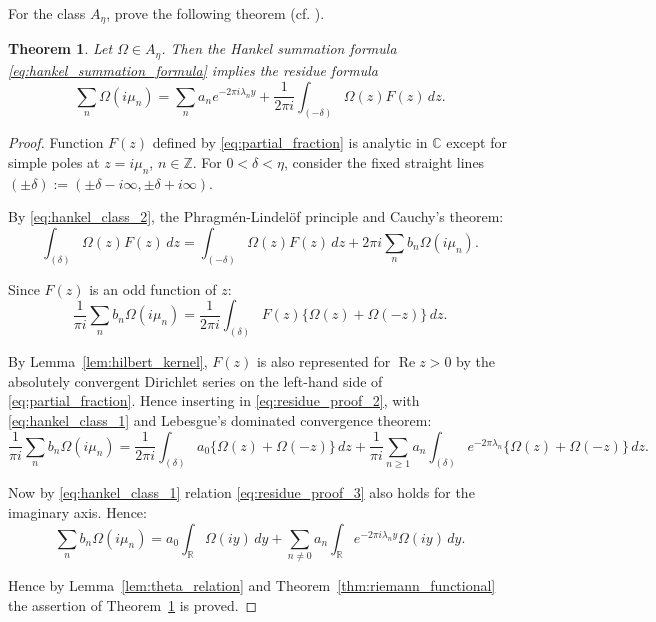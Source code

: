 \documentclass[11pt]{article}
\theoremstyle{plain}
\newtheorem{theorem}{Theorem}
\begin{document}
For the class $A_\eta$, prove the following theorem (cf. \cite{19}).

\begin{theorem}
\label{thm:residue_formula}
Let $\Omega \in A_\eta$. Then the Hankel summation formula \eqref{eq:hankel_summation_formula} implies the residue formula
\begin{equation}
\sum_n \Omega(i\mu_n) = \sum_n a_n e^{-2\pi i \lambda_n y} + \frac{1}{2\pi i} \int_{(-\delta)} \Omega(z) F(z) \, dz.
\label{eq:residue_formula_eq}
\end{equation}
\end{theorem}

\begin{proof}
Function $F(z)$ defined by \eqref{eq:partial_fraction} is analytic in $\mathbb{C}$ except for simple poles at $z = i\mu_n$, $n \in \mathbb{Z}$. For $0 < \delta < \eta$, consider the fixed straight lines $(\pm\delta) := (\pm\delta - i\infty, \pm\delta + i\infty)$.

By \eqref{eq:hankel_class_2}, the Phragmén-Lindelöf principle and Cauchy's theorem:
\begin{equation}
\int_{(\delta)} \Omega(z) F(z) \, dz = \int_{(-\delta)} \Omega(z) F(z) \, dz + 2\pi i \sum_n b_n \Omega(i\mu_n).
\label{eq:residue_proof_1}
\end{equation}

Since $F(z)$ is an odd function of $z$:
\begin{equation}
\frac{1}{\pi i} \sum_{n} b_n \Omega(i\mu_n) = \frac{1}{2\pi i} \int_{(\delta)} F(z) \{\Omega(z) + \Omega(-z)\} \, dz.
\label{eq:residue_proof_2}
\end{equation}

By Lemma~\ref{lem:hilbert_kernel}, $F(z)$ is also represented for $\operatorname{Re} z > 0$ by the absolutely convergent Dirichlet series on the left-hand side of \eqref{eq:partial_fraction}. Hence inserting in \eqref{eq:residue_proof_2}, with \eqref{eq:hankel_class_1} and Lebesgue's dominated convergence theorem:
\begin{equation}
\frac{1}{\pi i} \sum_{n} b_n \Omega(i\mu_n) = \frac{1}{2\pi i} \int_{(\delta)} a_0 \{\Omega(z) + \Omega(-z)\} \, dz + \frac{1}{\pi i} \sum_{n \geq 1} a_n \int_{(\delta)} e^{-2\pi \lambda_n} \{\Omega(z) + \Omega(-z)\} \, dz.
\label{eq:residue_proof_3}
\end{equation}

Now by \eqref{eq:hankel_class_1} relation \eqref{eq:residue_proof_3} also holds for the imaginary axis. Hence:
\begin{equation}
\sum_n b_n \Omega(i\mu_n) = a_0 \int_{\mathbb{R}} \Omega(iy) \, dy + \sum_{n \neq 0} a_n \int_{\mathbb{R}} e^{-2\pi i \lambda_n y} \Omega(iy) \, dy.
\label{eq:residue_proof_4}
\end{equation}

Hence by Lemma~\ref{lem:theta_relation} and Theorem~\ref{thm:riemann_functional} the assertion of Theorem~\ref{thm:residue_formula} is proved.
\end{proof}
\end{document}
